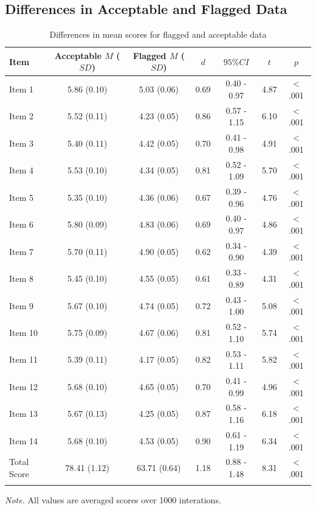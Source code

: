 \documentclass[english,man]{apa6}
\theoremstyle{definition}
\theoremstyle{definition}
\theoremstyle{definition}
\theoremstyle{remark}
\begin{document}
\subsection{Differences in Acceptable and Flagged
Data}\label{differences-in-acceptable-and-flagged-data}

\begin{table}[tbp]
\begin{center}
\begin{threeparttable}
\caption{\label{tab:diff-table}Differences in mean scores for flagged and acceptable data}
\begin{tabular}{lcccccc}
\toprule
Item & Acceptable $M$ ($SD$) & Flagged $M$ ($SD$) & $d$ & $95\% CI$ & $t$ & $p$\\
\midrule
Item 1 & 5.86 (0.10) & 5.03 (0.06) & 0.69 & 0.40 - 0.97 & 4.87 & < .001\\
Item 2 & 5.52 (0.11) & 4.23 (0.05) & 0.86 & 0.57 - 1.15 & 6.10 & < .001\\
Item 3 & 5.40 (0.11) & 4.42 (0.05) & 0.70 & 0.41 - 0.98 & 4.91 & < .001\\
Item 4 & 5.53 (0.10) & 4.34 (0.05) & 0.81 & 0.52 - 1.09 & 5.70 & < .001\\
Item 5 & 5.35 (0.10) & 4.36 (0.06) & 0.67 & 0.39 - 0.96 & 4.76 & < .001\\
Item 6 & 5.80 (0.09) & 4.83 (0.06) & 0.69 & 0.40 - 0.97 & 4.86 & < .001\\
Item 7 & 5.70 (0.11) & 4.90 (0.05) & 0.62 & 0.34 - 0.90 & 4.39 & < .001\\
Item 8 & 5.45 (0.10) & 4.55 (0.05) & 0.61 & 0.33 - 0.89 & 4.31 & < .001\\
Item 9 & 5.67 (0.10) & 4.74 (0.05) & 0.72 & 0.43 - 1.00 & 5.08 & < .001\\
Item 10 & 5.75 (0.09) & 4.67 (0.06) & 0.81 & 0.52 - 1.10 & 5.74 & < .001\\
Item 11 & 5.39 (0.11) & 4.17 (0.05) & 0.82 & 0.53 - 1.11 & 5.82 & < .001\\
Item 12 & 5.68 (0.10) & 4.65 (0.05) & 0.70 & 0.41 - 0.99 & 4.96 & < .001\\
Item 13 & 5.67 (0.13) & 4.25 (0.05) & 0.87 & 0.58 - 1.16 & 6.18 & < .001\\
Item 14 & 5.68 (0.10) & 4.53 (0.05) & 0.90 & 0.61 - 1.19 & 6.34 & < .001\\
Total Score & 78.41 (1.12) & 63.71 (0.64) & 1.18 & 0.88 - 1.48 & 8.31 & < .001\\
\bottomrule
\addlinespace
\end{tabular}
\begin{tablenotes}[para]
\textit{Note.} All values are averaged scores over 1000 interations.
\end{tablenotes}
\end{threeparttable}
\end{center}
\end{table}
\end{document}
